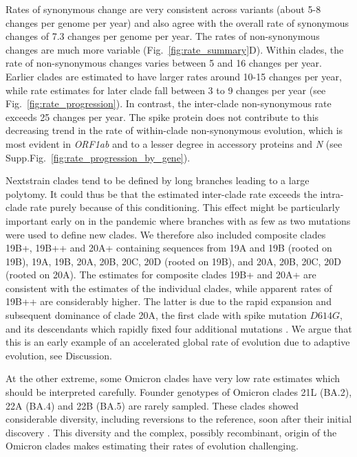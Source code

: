 \documentclass[aps,rmp, twocolumn]{revtex4}
\begin{document}
Rates of synonymous change are very consistent across variants (about 5-8 changes per genome per year) and also agree with the overall rate of synonymous changes of 7.3 changes per genome per year.
The rates of non-synonymous changes are much more variable (Fig.~\ref{fig:rate_summary}D).
Within clades, the rate of non-synonymous changes varies between 5 and 16 changes per year.
Earlier clades are estimated to have larger rates around 10-15 changes per year, while rate estimates for later clade fall  between 3 to 9 changes per year (see Fig.~\ref{fig:rate_progression}).
In contrast, the inter-clade non-synonymous rate exceeds 25 changes per year.
The spike protein does not contribute to this decreasing trend in the rate of within-clade non-synonymous evolution, which is most evident in \emph{ORF1ab} and to a lesser degree in accessory proteins and \emph{N} (see Supp.Fig.~\ref{fig:rate_progression_by_gene}).

Nextstrain clades tend to be defined by long branches leading to a large polytomy.
It could thus be that the estimated inter-clade rate exceeds the intra-clade rate purely because of this conditioning.
This effect might be particularly important early on in the pandemic where branches with as few as two mutations were used to define new clades.
We therefore also included composite clades 19B+, 19B++ and 20A+ containing sequences from 19A and 19B (rooted on 19B), 19A, 19B, 20A, 20B, 20C, 20D (rooted on 19B), and 20A, 20B, 20C, 20D (rooted on 20A).
The estimates for composite clades 19B+ and 20A+ are consistent with the estimates of the individual clades, while apparent rates of 19B++ are considerably higher.
The latter is due to the rapid expansion and subsequent dominance of clade 20A, the first clade with spike mutation $D614G$, and its descendants which rapidly fixed four additional mutations \citep{korber_tracking_2020}.
We argue that this is an early example of an accelerated global rate of evolution due to adaptive evolution, see Discussion.

At the other extreme, some Omicron clades have very low rate estimates which should be interpreted carefully.
Founder genotypes of Omicron clades 21L (BA.2), 22A (BA.4) and 22B (BA.5) are rarely sampled.
These clades showed considerable diversity, including reversions to the reference, soon after their initial discovery \citep{tegally_emergence_2022}.
This diversity and the complex, possibly recombinant, origin of the Omicron clades makes estimating their rates of evolution challenging.
\end{document}
